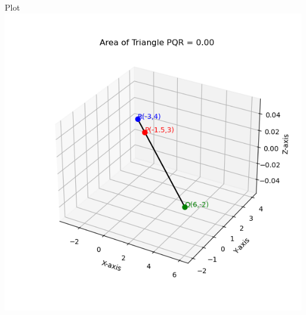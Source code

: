 \documentclass{beamer}
\begin{document}
\begin{frame}{Plot}
    \centering
    \includegraphics[width=\columnwidth, height=0.8\textheight, keepaspectratio]{figs/fig4.png}     
\end{frame}
\end{document}
